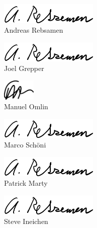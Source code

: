 \documentclass[main.tex]{subfiles}
\begin{document}
\begin{flushleft}
    \begin{figure}[H]
        \includegraphics[height=1cm,]{AR}\\
        Andreas Rebsamen \\
    \end{figure}
    \begin{figure}[H]
        \includegraphics[height=1cm,]{AR}\\
        Joel Grepper\\
    \end{figure}
    \begin{figure}[H]
        \includegraphics[height=1cm,]{MO}\\
        Manuel Omlin\\
    \end{figure}
    \begin{figure}[H]
        \includegraphics[height=1cm,]{AR}\\
        Marco Schöni\\ 
    \end{figure}
    \begin{figure}[H]
        \includegraphics[height=1cm,]{AR}\\
        Patrick Marty\\ 
    \end{figure}
    \begin{figure}[H]
        \includegraphics[height=1cm,]{AR}\\
        Steve Ineichen\\
    \end{figure}
\end{flushleft}


\pagebreak
\end{document}
